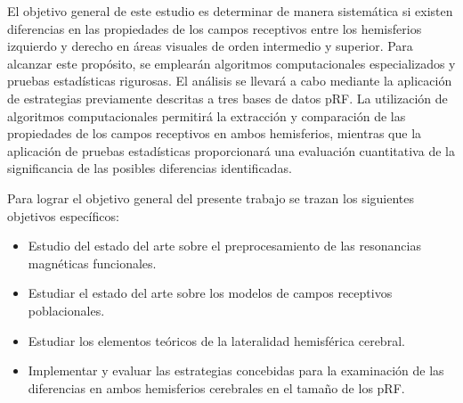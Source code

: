 \documentclass{article}
\begin{document}
	
	El objetivo general de este estudio es determinar de manera sistemática si existen diferencias en las propiedades de los campos receptivos entre los hemisferios izquierdo y derecho en áreas visuales de orden intermedio y superior. Para alcanzar este propósito, se emplearán algoritmos computacionales especializados y pruebas estadísticas rigurosas. El análisis se llevará a cabo mediante la aplicación de estrategias previamente descritas a tres bases de datos pRF. La utilización de algoritmos computacionales permitirá la extracción y comparación de las propiedades de los campos receptivos en ambos hemisferios, mientras que la aplicación de pruebas estadísticas proporcionará una evaluación cuantitativa de la significancia de las posibles diferencias identificadas.
	
	Para lograr el objetivo general del presente trabajo se
	trazan los siguientes objetivos específicos:
	
	\begin{itemize}
		\item Estudio del estado del arte sobre el preprocesamiento de las resonancias magn\'eticas funcionales.
		\item Estudiar el estado del arte sobre los modelos de campos receptivos poblacionales.
		\item Estudiar los elementos te\'oricos de la lateralidad hemisf\'erica cerebral.
		\item Implementar y evaluar las estrategias concebidas para la examinaci\'on de las diferencias en ambos hemisferios cerebrales en el tama\~no de los pRF.
	
	\end{itemize}
\end{document}
